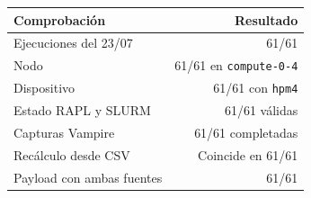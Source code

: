 \begin{tabular}{lr}
\hline
Comprobación & Resultado \\
\hline
Ejecuciones del 23/07 & 61/61 \\
Nodo & 61/61 en \texttt{compute-0-4} \\
Dispositivo & 61/61 con \texttt{hpm4} \\
Estado RAPL y SLURM & 61/61 válidas \\
Capturas Vampire & 61/61 completadas \\
Recálculo desde CSV & Coincide en 61/61 \\
Payload con ambas fuentes & 61/61 \\
\hline
\end{tabular}
